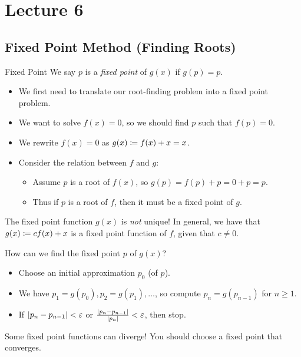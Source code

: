 \documentclass[class=article, crop=false]{standalone}
\begin{document}
  \section{Lecture 6}
  \subsection{Fixed Point Method (Finding Roots)}
  \begin{definition}{Fixed Point}
    We say $p$ is a \emph{fixed point} of $g(x)$ if $g(p) = p$.
  \end{definition}
  \begin{itemize}
    \item We first need to translate our root-finding problem into a fixed point problem.
    \item We want to solve $f(x) = 0$, so we should find $p$ such that $f(p) = 0$.
    \item We rewrite $f(x) = 0$ as $g(x)\coloneqq f(x) + x = x$.
    \item Consider the relation between $f$ and $g$:
    \begin{itemize}
      \item Assume $p$ is a root of $f(x)$, so $g(p) = f(p) + p = 0 + p = p$.
      \item Thus if $p$ is a root of $f$, then it must be a fixed point of $g$.
    \end{itemize}
  \end{itemize}
  \begin{note}{}
    The fixed point function $g(x)$ is \emph{not} unique! In general, we have that $g(x)\coloneqq cf(x) + x$ is a fixed point function of $f$, given that $c\neq 0$.
  \end{note}
  How can we find the fixed point $p$ of $g(x)$?
  \begin{itemize}
    \item Choose an initial approximation $p_0$ (of $p$).
    \item We have $p_1 = g(p_0), p_2 = g(p_1), \dotsc$, so compute $p_n = g(p_{n - 1})$ for $n\geq 1$.
    \item If $\left\lvert p_n - p_{n - 1} \right\rvert < \varepsilon$ or $\frac{\left\lvert p_n - p_{n - 1} \right\rvert}{\left\lvert p_n \right\rvert} < \varepsilon$, then stop.
  \end{itemize}
  \begin{note}{}
    Some fixed point functions can diverge! You should choose a fixed point that converges.
  \end{note}
\end{document}
